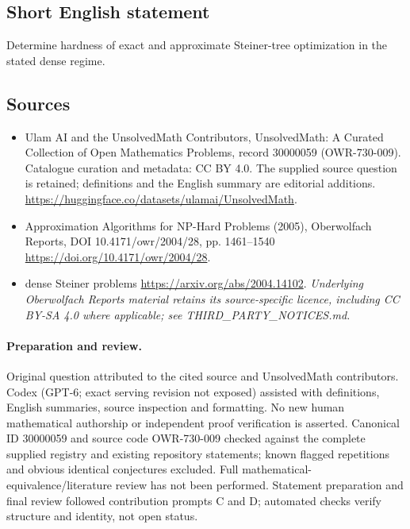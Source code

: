 \documentclass[11pt]{article}
\begin{document}
\subsection{Short English statement}
Determine hardness of exact and approximate Steiner-tree optimization in the stated dense regime.
\subsection{Sources}
\begin{itemize}
\item[\hypertarget{source:30000059:1}{S1}] Ulam AI and the UnsolvedMath Contributors, UnsolvedMath: A Curated Collection of Open Mathematics Problems, record 30000059 (OWR-730-009). Catalogue curation and metadata: CC BY 4.0. The supplied source question is retained; definitions and the English summary are editorial additions.
\url{https://huggingface.co/datasets/ulamai/UnsolvedMath}.
\item[\hypertarget{source:30000059:2}{S2}] Approximation Algorithms for NP-Hard Problems (2005), Oberwolfach Reports, DOI 10.4171/owr/2004/28, pp. 1461--1540
\url{https://doi.org/10.4171/owr/2004/28}.
\item[\hypertarget{source:30000059:3}{S3}] dense Steiner problems
\url{https://arxiv.org/abs/2004.14102}.
\textit{Underlying Oberwolfach Reports material retains its source-specific licence, including CC BY-SA 4.0 where applicable; see THIRD\_PARTY\_NOTICES.md.}
\end{itemize}
\paragraph{Preparation and review.}
Original question attributed to the cited source and UnsolvedMath contributors. Codex (GPT-6; exact serving revision not exposed) assisted with definitions, English summaries, source inspection and formatting. No new human mathematical authorship or independent proof verification is asserted. Canonical ID 30000059 and source code OWR-730-009 checked against the complete supplied registry and existing repository statements; known flagged repetitions and obvious identical conjectures excluded. Full mathematical-equivalence/literature review has not been performed. Statement preparation and final review followed contribution prompts C and D; automated checks verify structure and identity, not open status.
\label{end:30000059}
\end{document}
